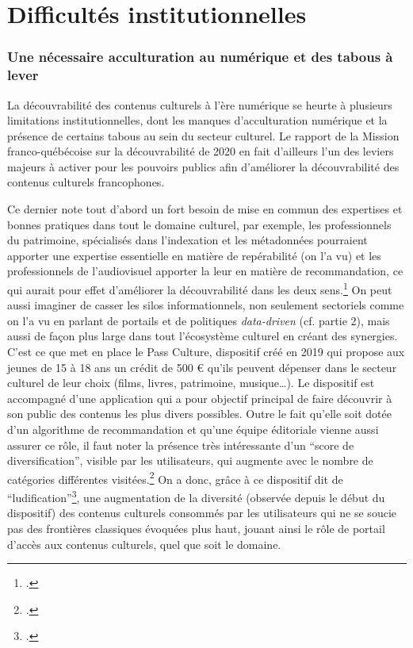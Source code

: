 \chapter{Difficultés institutionnelles}

\subsection{Une nécessaire acculturation au numérique et des tabous à lever}

La découvrabilité des contenus culturels à l’ère numérique se heurte à plusieurs limitations institutionnelles, dont les manques d’acculturation numérique et la présence de certains tabous au sein du secteur culturel. Le rapport de la Mission franco-québécoise sur la découvrabilité de 2020 en fait d’ailleurs l’un des leviers majeurs à activer pour les pouvoirs publics afin d’améliorer la découvrabilité des contenus culturels francophones. 

Ce dernier note tout d’abord un fort besoin de mise en commun des expertises et bonnes pratiques dans tout le domaine culturel, par exemple, les professionnels du patrimoine, spécialisés dans l’indexation et les métadonnées pourraient apporter une expertise essentielle en matière de repérabilité (on l’a vu) et les professionnels de l’audiovisuel apporter la leur en matière de recommandation, ce qui aurait pour effet d’améliorer la découvrabilité dans les deux sens.\footcite[p. 31]{ministeresdelaculturefranceetquebec2020} On peut aussi imaginer de casser les silos informationnels, non seulement sectoriels comme on l’a vu en parlant de portails et de politiques \textit{data-driven} (cf. partie 2), mais aussi de façon plus large dans tout l’écosystème culturel en créant des synergies. C’est ce que met en place le Pass Culture, dispositif créé en 2019 qui propose aux jeunes de 15 à 18 ans un crédit de 500 € qu’ils peuvent dépenser dans le secteur culturel de leur choix (films, livres, patrimoine, musique…). Le dispositif est accompagné d’une application qui a pour objectif principal de faire découvrir à son public des contenus les plus divers possibles. Outre le fait qu’elle soit dotée d’un algorithme de recommandation et qu’une équipe éditoriale vienne aussi assurer ce rôle, il faut noter la présence très intéressante d’un \enquote{score de diversification}, visible par les utilisateurs, qui augmente avec le nombre de catégories différentes visitées.\footcite{martinstocker} On a donc, grâce à ce dispositif dit de \enquote{ludification}\footcite{2024g}, une augmentation de la diversité (observée depuis le début du dispositif) des contenus culturels consommés par les utilisateurs qui ne se soucie pas des frontières classiques évoquées plus haut, jouant ainsi le rôle de portail d’accès aux contenus culturels, quel que soit le domaine.

